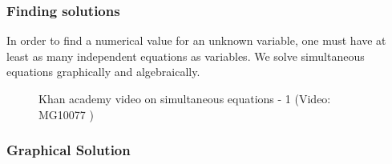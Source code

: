       
      \label{m39257*uid93}
            \subsubsection{ Finding solutions}
            \nopagebreak
            
        
        \label{m39257*id159052}In order to find a numerical value for an unknown variable, one must have at least as many independent equations as variables. We solve simultaneous equations graphically and algebraically.\par \label{m39257*eip-487}
    \setcounter{subfigure}{0}


	\begin{figure}[H] %
    
    
    \textnormal{Khan academy video on simultaneous equations - 1}\vspace{.1in} \nopagebreak
  \label{m39257*yt-media7}\label{m39257*yt-video7}
             { (Video:  MG10077 )}
      
      \vspace{2pt}
    \vspace{.1in}
    
    

 \end{figure}   

    \addtocounter{footnote}{-0}
    \par 
      
      \label{m39257*uid94}
            \subsubsection{ Graphical Solution}
            \nopagebreak
            
